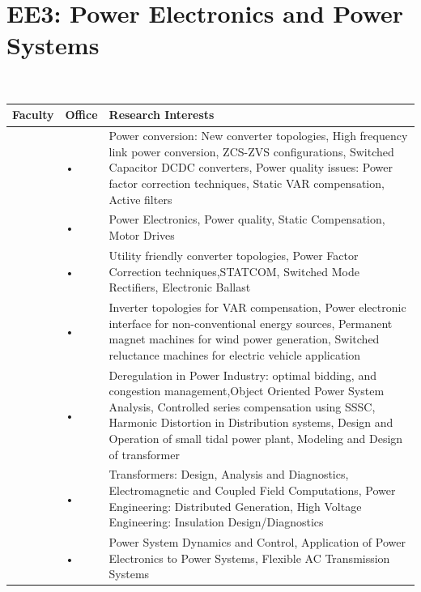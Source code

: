 \documentclass[openany]{book} %
\begin{document}
\section{EE3: Power Electronics and Power Systems}
~\vfill
~\vfill
\begin{tabular}{p{3.5cm} p{3.5cm}p{9cm}}
\hline 
\hline 
Faculty  & Office  & Research Interests \\ 
\hline 
\href{https://www.ee.iitb.ac.in/~agarwal/}{\color{blue}{Prof. Vivek Agarwal }}& • & Power conversion: New converter topologies, High frequency link
power conversion, ZCS-ZVS configurations, Switched Capacitor DCDC converters, Power quality issues: Power factor correction techniques, Static VAR compensation, Active filters \\ 
\hline 
\href{https://www.ee.iitb.ac.in/~mukul/}{\color{blue}{Prof. Mukul C. Chandorkar }}& • & Power Electronics, Power quality, Static Compensation, Motor Drives \\ 
\hline 
\href{https://www.ee.iitb.ac.in/wiki/faculty/kishore}{\color{blue}{Prof. Kishore Chatterjee}} & • & Utility friendly converter topologies, Power Factor Correction techniques,STATCOM, Switched Mode Rectifiers, Electronic Ballast \\ 
\hline 
\href{https://www.ee.iitb.ac.in/wiki/faculty/bgf}{\color{blue}{Prof. Baylon G. Fernandes}} & • & Inverter topologies for VAR compensation, Power electronic interface for non-conventional energy sources, Permanent magnet machines for
wind power generation, Switched reluctance machines for electric vehicle application \\ 
\hline 
\href{https://www.ee.iitb.ac.in/wiki/faculty/sak}{\color{blue}{Prof. Shrikrishna A. Khaparde }}& • & Deregulation in Power Industry: optimal bidding, and congestion management,Object Oriented Power System Analysis, Controlled series compensation using SSSC, Harmonic Distortion in Distribution systems, Design and Operation of small tidal power plant, Modeling and Design of transformer \\ 
\hline 
\href{https://www.ee.iitb.ac.in/wiki/faculty/svk}{\color{blue}{Prof. Shrikrishna V. Kulkarni }}& • & Transformers: Design, Analysis and Diagnostics, Electromagnetic and Coupled Field Computations, Power Engineering: Distributed Generation, High Voltage Engineering: Insulation Design/Diagnostics \\ 
\hline 
\href{https://www.ee.iitb.ac.in/wiki/faculty/anil}{\color{blue}{Prof. Anil Kulkarni }}& • & Power System Dynamics and Control, Application of Power Electronics to Power Systems, Flexible AC Transmission Systems \\ 

\end{tabular}
\end{document}
